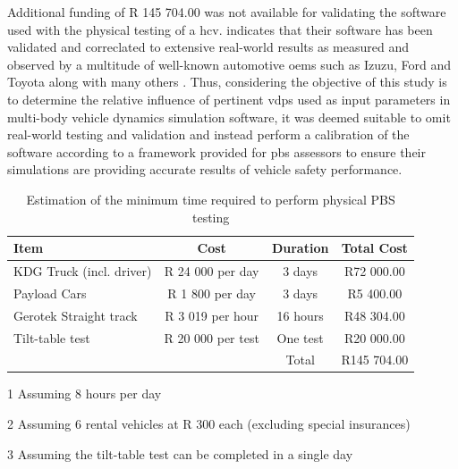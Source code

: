 Additional funding of R 145 704.00 was not available for validating the software used with the physical testing of a \gls{hcv}. \trucksim{} indicates that their software has been validated and correclated to extensive real-world results as measured and observed by a multitude of well-known automotive \glspl{oem} such as Izuzu, Ford and Toyota along with many others \cite{MechanicalSimulation2018}. Thus, considering the objective of this study is to determine the relative influence of pertinent \glspl{vdp} used as input parameters in multi-body vehicle dynamics simulation software, it was deemed suitable to omit real-world testing and validation and instead perform a calibration of the software according to a framework provided for \gls{pbs} assessors to ensure their simulations are providing accurate results of vehicle safety performance.

\begin{table}[H]
	\centering\footnotesize
	\begin{threeparttable}

		\begin{tabulary}{\textwidth}{lccc}
			\toprule
\textbf{Item}          & \textbf{Cost}     & \textbf{Duration}   & \textbf{Total Cost}  \\
			\midrule

KDG Truck (incl. driver) & R 24 000 per day  & 3 days    & R72 000.00  \\
Payload Cars           & R 1 800 per day   & 3 days     & R5 400.00   \\
Gerotek Straight track & R 3 019 per hour  & 16 hours & R48 304.00  \\
Tilt-table test        & R 20 000 per test & One test   & R20 000.00  \\
                       &                   & Total      & R145 704.00 \\
			\bottomrule
		\end{tabulary}

		\caption{Estimation of the minimum time required to perform physical PBS testing}
		\label{table:est-cost-physical-pbs-testing}

		\begin{tablenotes}
		\item[1] Assuming 8 hours per day
		\item[2] Assuming 6 rental vehicles at R 300 each (excluding special insurances)
		\item[3] Assuming the tilt-table test can be completed in a single day
		\end{tablenotes}

	\end{threeparttable}
\end{table}

